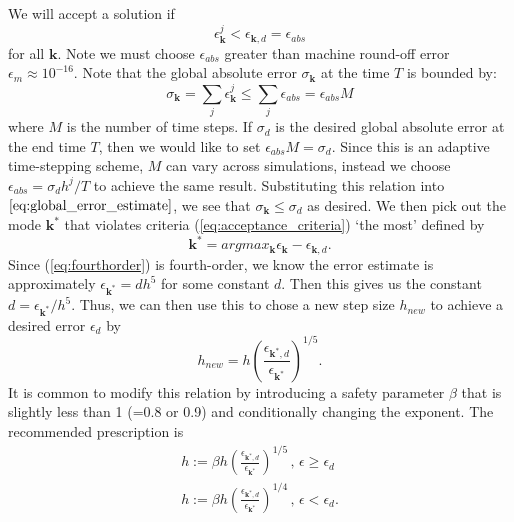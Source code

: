 \documentclass[12pt]{article}
\begin{document}
We will accept a solution if 
\begin{equation}
\label{eq:acceptance_criteria}
\epsilon_{\mathbf{k}}^{j}< \epsilon_{\mathbf{k},d} =  \epsilon_{abs}
\end{equation}
for all $\mathbf{k}$. Note we must choose  $\epsilon_{abs}$ greater than machine round-off error $\epsilon_{m} \approx 10^{-16}$.  Note that the global absolute error  $\sigma_{\mathbf{k}}$ at the time $T$ is bounded by:
\begin{equation}
\label{eq:global_error_estimate}
\sigma_{\mathbf{k}}=\sum_{j} \epsilon^{j}_{\mathbf{k}} \leq \sum_{j} \epsilon_{abs}  =\epsilon_{abs} M
\end{equation}
where $M$ is the number of time steps. If $\sigma_{d}$ is the desired global absolute error at the end  time $T$, then we would like to set $\epsilon_{abs} M = \sigma_{d}$.  Since this is an adaptive time-stepping scheme, $M$ can vary across simulations, instead we choose $\epsilon_{abs}=\sigma_{d}h^{j}/T$ to achieve the same result. Substituting this relation into $\ref{eq:global_error_estimate}$, we see that $\sigma_{\mathbf{k}}\leq \sigma_{d}$ as desired. We then pick out the mode $\mathbf{k}^{*}$ that violates criteria (\ref{eq:acceptance_criteria}) `the most' defined by
\begin{equation}
\mathbf{k}^{*}=argmax_{\mathbf{k}} \epsilon_{\mathbf{k}}-\epsilon_{\mathbf{k},d}.
\end{equation}
Since (\ref{eq:fourthorder}) is fourth-order, we know the error estimate is approximately $\epsilon_{\mathbf{k}^{*}}=d h^{5}$ for some constant $d$. Then this gives us the constant $d= \epsilon_{\mathbf{k}^{*}}/h^5$. Thus, we can then use this to chose a new step size $h_{new}$ to achieve a desired  error $\epsilon_{d}$ by 
\begin{equation}
h_{new}=h \left(\frac{\epsilon_{\mathbf{k}^{*},d}}{\epsilon_{\mathbf{k}^{*}}}\right)^{1/5}.
\end{equation}
It is common to modify this relation by introducing a safety parameter $\beta $ that is slightly less than 1 (=0.8 or 0.9) and conditionally changing the exponent. The recommended prescription is 
\begin{eqnarray}
h := \beta h \left(\frac{\epsilon_{\mathbf{k}^{*},d}}{\epsilon_{\mathbf{k}^{*}}}\right)^{1/5} \, ,\, \epsilon \geq \epsilon_{d} \\
h := \beta h \left(\frac{\epsilon_{\mathbf{k}^{*},d}}{\epsilon_{\mathbf{k}^{*}}}\right)^{1/4}\, ,\, \epsilon <\epsilon_{d} .
\end{eqnarray}
\end{document}
